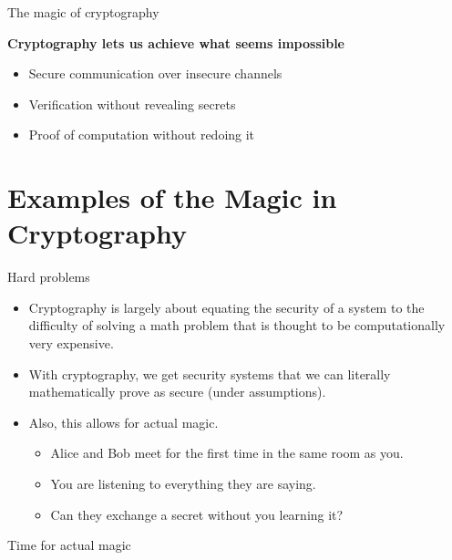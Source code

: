 \documentclass[aspectratio=169, lualatex, handout]{beamer}
\begin{document}
\begin{frame}[c]{The magic of cryptography}
	\begin{center}
		\Large\textbf{Cryptography lets us achieve what seems impossible}
		\vspace{1cm}
		\begin{itemize}[<+->]
			\item Secure communication over insecure channels
			\item Verification without revealing secrets
			\item Proof of computation without redoing it
		\end{itemize}
	\end{center}
\end{frame}

\section{Examples of the Magic in Cryptography}

\begin{frame}{Hard problems}
	\begin{itemize}[<+->]
		\item Cryptography is largely about equating the security of a system to the
		      difficulty of solving a math problem that is thought to be computationally
		      very expensive.
		\item With cryptography, we get security systems that we can literally
		      mathematically prove as secure (under assumptions).
		\item Also, this allows for actual magic.
		      \begin{itemize}[<+->]
			      \item Alice and Bob meet for the first time in the same room as you.
			      \item You are listening to everything they are saying.
			      \item Can they exchange a secret without you learning it?
		      \end{itemize}
	\end{itemize}
\end{frame}

\begin{frame}{Time for actual magic}
\end{frame}
\end{document}
